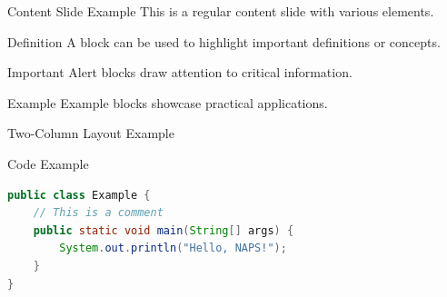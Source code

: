 \documentclass[aspectratio=169, 11pt]{beamer}
\begin{document}
\begin{frame}{Content Slide Example}
  This is a regular content slide with various elements.

  \begin{block}{Definition}
    A block can be used to highlight important definitions or concepts.
  \end{block}

  \begin{alertblock}{Important}
    Alert blocks draw attention to critical information.
  \end{alertblock}

  \begin{exampleblock}{Example}
    Example blocks showcase practical applications.
  \end{exampleblock}
\end{frame}

\begin{frame}{Two-Column Layout Example}
\end{frame}

\begin{frame}[fragile]{Code Example}
  \begin{lstlisting}[language=Java]
public class Example {
    // This is a comment
    public static void main(String[] args) {
        System.out.println("Hello, NAPS!");
    }
}
  \end{lstlisting}
\end{frame}
\end{document}
